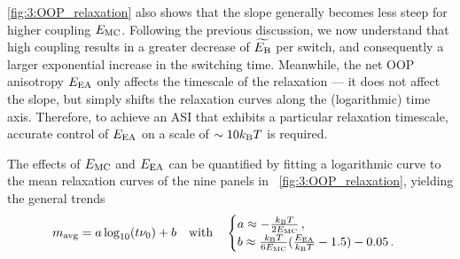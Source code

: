 \cref{fig:3:OOP_relaxation} also shows that the slope generally becomes less steep for higher coupling $E_\mathrm{MC}$.
Following the previous discussion, we now understand that high coupling results in a greater decrease of $\widetilde{E_\mathrm{B}}$ per switch, and consequently a larger exponential increase in the switching time.
Meanwhile, the net OOP anisotropy $E_\mathrm{EA}$ only affects the timescale of the relaxation --- it does not affect the slope, but simply shifts the relaxation curves along the (logarithmic) time axis.
Therefore, to achieve an ASI that exhibits a particular relaxation timescale, accurate control of $E_\mathrm{EA}$ on a scale of $\sim 10\kBT$ is required. \par
The effects of $E_\mathrm{MC}$ and $E_\mathrm{EA}$ can be quantified by fitting a logarithmic curve to the mean relaxation curves of the nine panels in ~\cref{fig:3:OOP_relaxation}, yielding the general trends
\begin{equation}
	\label{eq:3:relaxation_fit_ab}
	\mavg = a \log_{10}(t \nu_0) + b \quad \mathrm{with} \quad \begin{cases}
		a \approx -\frac{\kBT}{2\EMC} \, \mathrm{,} \\
		b \approx \frac{\kBT}{6\EMC}(\frac{\EEA}{\kBT} - 1.5) - 0.05 \, \mathrm{.}
	\end{cases}
\end{equation} %


